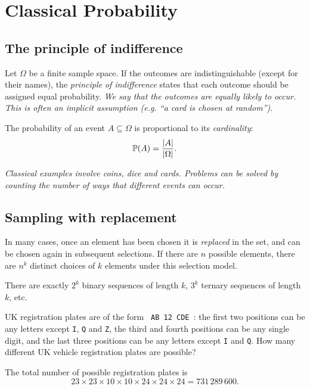 \chapter{Classical Probability}\label{chap:classical}

\section{The principle of indifference}
Let $\Omega$ be a finite sample space. If the outcomes are indistinguishable (except for their names), the \emph{principle of indifference} states that each outcome should be assigned equal probability.
\bit
\it We say that the outcomes are \emph{equally likely} to occur.
\it This is often an implicit assumption (e.g. ``a card is chosen at random'').
\eit

The probability of an event $A\subseteq\Omega$ is proportional to its \emph{cardinality}:
\[
\mathbb{P}(A) = \displaystyle\frac{|A|}{|\Omega|}.
\]

\bit
\it Classical examples involve \emph{coins}, \emph{dice} and \emph{cards}.
\it Problems can be solved by counting the number of ways that different events can occur.
\eit

\section{Sampling with replacement}
In many cases, once an element has been chosen it is \emph{replaced} in the set, and can be chosen again in subsequent selections. If there are $n$ possible elements, there are $n^k$ distinct choices of $k$ elements under this selection model.

\begin{example} 
There are exactly $2^k$ binary sequences of length $k$, $3^k$ ternary sequences of length $k$, etc.
\end{example}

\begin{example}
UK registration plates are of the form \texttt{\,AB\,12\,CDE\,}: the first two positions can be any letters except \texttt{I}, \texttt{Q} and \texttt{Z}, the third and fourth positions can be any single digit, and the last three positions can be any letters except \texttt{I} and \texttt{Q}. 
How many different UK vehicle registration plates are possible?
\end{example}
\begin{solution}
The total number of possible registration plates is 
\[
23 \times 23 \times 10 \times 10 \times 24 \times 24 \times 24 = 731\,289\,600.
\]
\end{solution}

